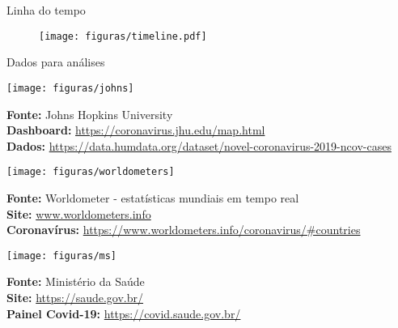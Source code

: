 \documentclass[xcolor=table,t]{beamer}
\begin{document}
\begin{frame}[c]{Linha do tempo}
\vspace{-0.3 cm}
\begin{figure}
	\centering
	\hspace{-0.8 cm}
	\texttt{[image: figuras/timeline.pdf]}
\end{figure}
\end{frame}

\begin{frame}[c]{Dados para análises}
\hspace{-1.5 cm}\begin{minipage}[c]{3.0 cm}
	\centering
	\texttt{[image: figuras/johns]} 
\end{minipage}
\begin{minipage}[r]{8 cm}
	\scriptsize \textbf{Fonte:} Johns Hopkins University  \\
    \textbf{Dashboard:} \href{https://coronavirus.jhu.edu/map.html}{https://coronavirus.jhu.edu/map.html} \\ 
    \textbf{Dados:} \href{https://data.humdata.org/dataset/novel-coronavirus-2019-ncov-cases}{https://data.humdata.org/dataset/novel-coronavirus-2019-ncov-cases} \\
\end{minipage}
\vspace{0.4 cm}

\hspace{-1.5 cm}\begin{minipage}[c]{3.0 cm}
	\centering
	\texttt{[image: figuras/worldometers]} 
\end{minipage}
\begin{minipage}[r]{8 cm}
	\scriptsize \textbf{Fonte:} Worldometer - estatísticas mundiais em tempo real  \\
	\textbf{Site:} \href{www.worldometers.info}{www.worldometers.info} \\ 
	\textbf{Coronavírus:} \href{https://www.worldometers.info/coronavirus/\#countries}{https://www.worldometers.info/coronavirus/\#countries} \\
\end{minipage}
\vspace{0.4 cm}

\hspace{-1.5 cm}\begin{minipage}[c]{3.0 cm}
	\centering
	\texttt{[image: figuras/ms]} 
\end{minipage}
\begin{minipage}[r]{8 cm}
	\scriptsize \textbf{Fonte:} Ministério da Saúde  \\
	\textbf{Site:} \href{https://saude.gov.br/}{https://saude.gov.br/} \\ 
	\textbf{Painel Covid-19:} \href{https://covid.saude.gov.br/}{https://covid.saude.gov.br/} \\
\end{minipage}
\vspace{0.4 cm}


\end{frame}
\end{document}
